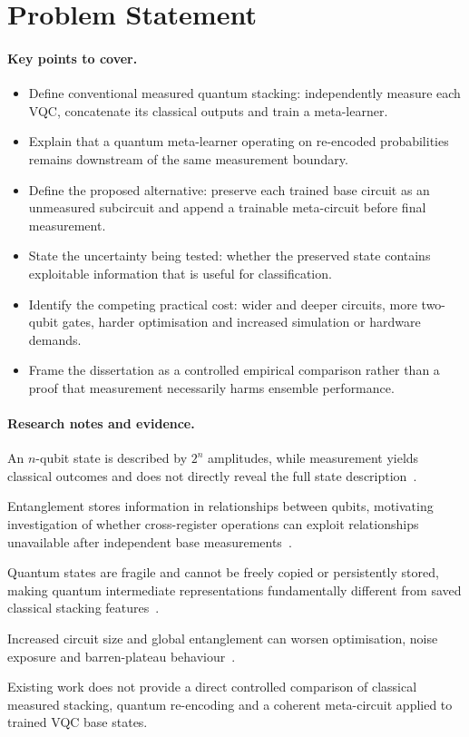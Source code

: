 \documentclass[]{UCD_CS_MSc_AAI_Report}
\newcommand{\challenge}[1]{{\color{red}#1}}
\newcommand{\theory}[1]{{\color{gray}#1}}
\newcommand{\gap}[1]{{\color{black}#1}}
\newcommand{\sectionbrief}{\paragraph{Key points to cover.}}
\newcommand{\researchnotes}{\paragraph{Research notes and evidence.}}
\begin{document}
\section{Problem Statement}
\label{sec:intro-problem}

\sectionbrief
\begin{itemize}
    \item Define conventional measured quantum stacking: independently measure each VQC, concatenate its classical outputs and train a meta-learner.
    \item Explain that a quantum meta-learner operating on re-encoded probabilities remains downstream of the same measurement boundary.
    \item Define the proposed alternative: preserve each trained base circuit as an unmeasured subcircuit and append a trainable meta-circuit before final measurement.
    \item State the uncertainty being tested: whether the preserved state contains exploitable information that is useful for classification.
    \item Identify the competing practical cost: wider and deeper circuits, more two-qubit gates, harder optimisation and increased simulation or hardware demands.
    \item Frame the dissertation as a controlled empirical comparison rather than a proof that measurement necessarily harms ensemble performance.
\end{itemize}

\researchnotes
\begin{itemize}
    \theory{\item An $n$-qubit state is described by $2^n$ amplitudes, while measurement yields classical outcomes and does not directly reveal the full state description~\cite{resch_quantum_2019}.}
    \theory{\item Entanglement stores information in relationships between qubits, motivating investigation of whether cross-register operations can exploit relationships unavailable after independent base measurements~\cite{resch_quantum_2019}.}
    \challenge{\item Quantum states are fragile and cannot be freely copied or persistently stored, making quantum intermediate representations fundamentally different from saved classical stacking features~\cite{resch_quantum_2019}.}
    \challenge{\item Increased circuit size and global entanglement can worsen optimisation, noise exposure and barren-plateau behaviour~\cite{du_quantum_2025,cerezo_challenges_2022}.}
    \gap{\item Existing work does not provide a direct controlled comparison of classical measured stacking, quantum re-encoding and a coherent meta-circuit applied to trained VQC base states.}
\end{itemize}
\end{document}
